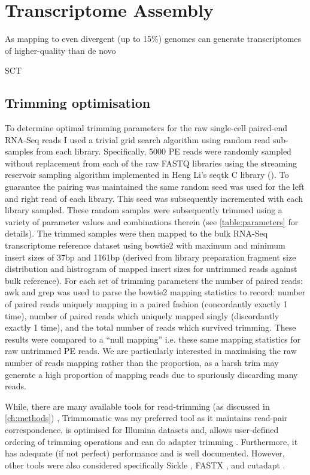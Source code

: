 \section{Transcriptome Assembly}




As mapping to even divergent (up to 15\%) genomes can generate transcriptomes of higher-quality
than de novo \citep{Vijay2013}

SCT
\subsection{Trimming optimisation}
To determine optimal trimming parameters for the raw single-cell paired-end RNA-Seq reads 
I used a trivial grid search algorithm using random read sub-samples from each library.
Specifically, 5000 PE reads were randomly sampled without replacement from each of the raw FASTQ libraries 
using the streaming reservoir sampling \citep{Vitter1985} algorithm implemented in Heng Li's 
seqtk C library (\citep{SeqtkGitHub}).
To guarantee the pairing was maintained the same random seed was used for the left and right read
of each library. This seed was subsequently incremented with each library sampled.
These random samples were subsequently trimmed using a variety of parameter values and combinations therein 
(see \ref{table:parameters} for details).
The trimmed samples were then mapped to the bulk RNA-Seq transcriptome reference dataset using bowtie2
\citep{Langmead2012} with maximum and minimum insert sizes of 37bp and 1161bp (derived from library preparation
fragment size distribution and histrogram of mapped insert sizes for untrimmed reads against bulk reference).
For each set of trimming parameters the number of paired reads: awk and grep was used to parse 
the bowtie2 mapping statistics to record: number of paired reads uniquely mapping in a paired 
fashion (concordantly exactly 1 time), number of paired reads which uniquely mapped 
singly (discordantly exactly 1 time), and the total number of reads which survived trimming.
These results were compared to a ``null mapping'' i.e. these same mapping statistics for raw untrimmed
PE reads.  We are particularly interested in maximising the raw number of reads mapping rather than
the proportion, as a harsh trim may generate a high proportion of mapping reads due to spuriously discarding 
many reads.

While, there are many available tools for read-trimming (as discussed in \ref{ch:methods}) , 
Trimmomatic was my preferred tool as it maintains read-pair correspondence, is optimised for Illumina datasets and, allows user-defined ordering of trimming operations and can do adapter trimming \citep{Bolger2014a}.  
Furthermore, it has adequate (if not perfect) performance and is well documented.
However, other tools were also considered specifically Sickle \citep{JoshiGitHub}, FASTX \citep{gordon2010fastx}, 
and cutadapt \citep{martin2011cutadapt}.

